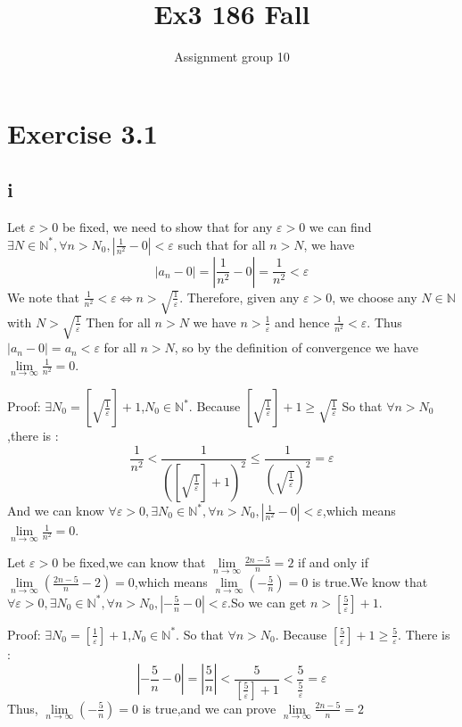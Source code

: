 \documentclass[11pt,twoside,a4paper]{article}
\begin{document}
\title{Ex3 186 Fall}
\author{Assignment group 10}
\date{}
\maketitle
\section{Exercise 3.1}
\subsection{i}
Let $\varepsilon>0$ be fixed, we need to show that for any $\varepsilon > 0 $ we can find $\displaystyle\exists N\in \mathbb{N}^*,\forall n>N_{0},|\frac{1}{n^2}-0|<\varepsilon$ such that for all $n>N$, we have 
$$|a_{n}-0|=| \frac{1}{n^2}-0|= \frac{1}{n^2}<\varepsilon$$
We note that $\displaystyle \frac{1}{n^2}<\varepsilon\Leftrightarrow n>\sqrt{\frac{1}{\varepsilon}}$. Therefore, given any $\varepsilon>0$, we choose any $N\in \mathbb{N}$ with $\displaystyle N>\sqrt{\frac{1}{\varepsilon}}$ Then for all $n > N$ we have $ n > \frac{1}{\varepsilon}$ and hence
$\frac{1}{n^2}<\varepsilon$. Thus $|a_{n}-0|=a_{n}<\varepsilon$ for all $ n > N$, so by the definition of convergence we have $\displaystyle\lim\limits_{n\to\infty}\frac{1}{n^2}=0$.
\par\noindent
 Proof: $\displaystyle \exists N_{0}=\left[\sqrt{\frac{1}{\varepsilon}}\right]+1$,$N_{0}\in \mathbb{N}^*$. 
Because $\displaystyle \left[\sqrt{\frac{1}{\varepsilon}}\right]+1\ge  \sqrt{\frac{1}{\varepsilon}}$
So that $\forall n> N_{0}$,there is :
$$\frac{1}{n^2} < \frac{1}{(\left[\sqrt{\frac{1}{\varepsilon}}\right]+1)^2}\le \frac{1}{(\sqrt{\frac{1}{\varepsilon}})^2}=\varepsilon$$
And we can know $\forall\varepsilon>0,\exists N_{0}\in \mathbb{N}^*,\forall n>N_{0}, \displaystyle |\frac{1}{n^2}-0|<\varepsilon$,which means $\displaystyle\lim\limits_{n\to\infty}\frac{1}{n^2}=0$.
\par\noindent
Let $\varepsilon>0$ be fixed,we can know that $\displaystyle\lim\limits_{n\to\infty}\frac{2n-5}{n}=2$ if and only if $\displaystyle\lim\limits_{n\to\infty}(\frac{2n-5}{n}-2)=0$,which means $\displaystyle\lim\limits_{n\to\infty}(-\frac{5}{n})=0$ is true.We know that $\displaystyle\forall\varepsilon>0,\exists N_{0}\in \mathbb{N}^*,\forall n>N_{0},|-\frac{5}{n}-0|<\varepsilon$.So we can get $\displaystyle n>\left[\frac{5}{\varepsilon} \right]+1$.\par\noindent
Proof: $\displaystyle \exists N_{0}=\left[\frac{1}{\varepsilon}\right]+1$,$N_{0}\in \mathbb{N}^*$. So that $\forall n> N_{0}$. Because $\displaystyle \left[\frac{5}{\varepsilon}\right]+1\ge  \frac{5}{\varepsilon}$. There is :
$$|-\frac{5}{n}-0|=|\frac{5}{n}| < \frac{5}{\left[\frac{5}{\varepsilon}\right]+1}<\frac{5}{\frac{5}{\varepsilon}}=\varepsilon$$
Thus, $\displaystyle\lim\limits_{n\to\infty}(-\frac{5}{n})=0$ is true,and we can prove $\displaystyle\lim\limits_{n\to\infty}\frac{2n-5}{n}=2$
\end{document}

